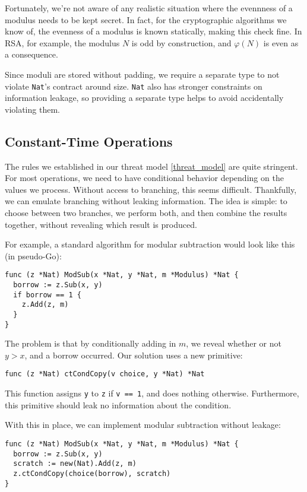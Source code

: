 \documentclass[11pt, a4paper]{article} %
\begin{document}
{Fortunately, we're not
aware of any realistic situation where the evennness of a
modulus needs to be kept secret. In fact, for the cryptographic
algorithms we know of, the evenness of a modulus 
is known statically, making this check fine.
In RSA, for example, the modulus $N$ is odd by construction, and
$\varphi(N)$ is even as a consequence.

Since moduli are stored without padding, we require a separate
type to not violate \texttt{Nat}'s contract around size.
\texttt{Nat} also has stronger constraints on information leakage,
so providing a separate type helps to avoid accidentally
violating them.

\subsection{Constant-Time Operations}

The rules we established in our threat model \ref{threat_model}
are quite stringent. For most operations, we need to have conditional
behavior depending on the values we process. Without access
to branching, this seems difficult.
Thankfully, we can emulate branching
without leaking information.
The idea is simple: to choose between two branches, we perform both,
and then combine
the results together, without revealing
which result is produced.

For example, a standard algorithm for modular subtraction would look
like this (in pseudo-Go):

\begin{verbatim}
func (z *Nat) ModSub(x *Nat, y *Nat, m *Modulus) *Nat {
  borrow := z.Sub(x, y)
  if borrow == 1 {
    z.Add(z, m)
  }
}
\end{verbatim}

The problem is that by conditionally adding in $m$, we reveal
whether or not $y > x$, and a borrow occurred. Our solution
uses a new primitive:

\begin{verbatim}
func (z *Nat) ctCondCopy(v choice, y *Nat) *Nat
\end{verbatim}

This function assigns \texttt{y} to \texttt{z} if
\texttt{v == 1}, and does nothing otherwise.
Furthermore, this primitive should leak no information about
the condition.

With this in place, we can implement modular subtraction without leakage:

\begin{verbatim}
func (z *Nat) ModSub(x *Nat, y *Nat, m *Modulus) *Nat {
  borrow := z.Sub(x, y)
  scratch := new(Nat).Add(z, m)
  z.ctCondCopy(choice(borrow), scratch)
}
\end{verbatim}

}
\end{document}
